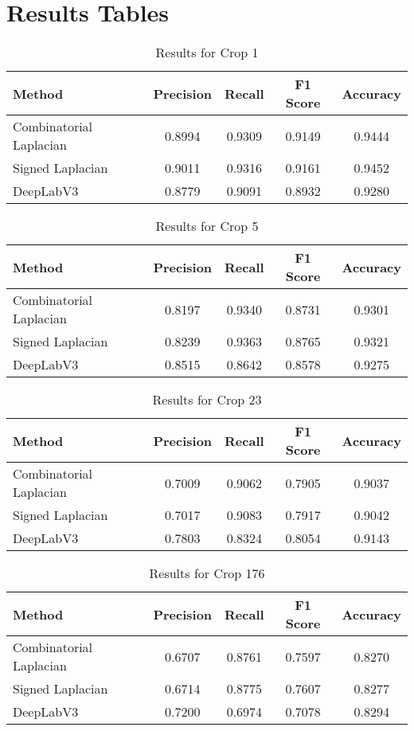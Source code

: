 \documentclass{article}
\begin{document}
\section*{Results Tables}

\begin{table}[h]
    \centering
    \caption{Results for Crop 1}
    \begin{tabular}{lcccc}
        \toprule
        Method & Precision & Recall & F1 Score & Accuracy \\
        \midrule
        Combinatorial Laplacian & 0.8994 & 0.9309 & 0.9149 & 0.9444 \\
        Signed Laplacian & 0.9011 & 0.9316 & 0.9161 & 0.9452 \\
        DeepLabV3 & 0.8779 & 0.9091 & 0.8932 & 0.9280 \\
        \bottomrule
    \end{tabular}
\end{table}

\begin{table}[h]
    \centering
    \caption{Results for Crop 5}
    \begin{tabular}{lcccc}
        \toprule
        Method & Precision & Recall & F1 Score & Accuracy \\
        \midrule
        Combinatorial Laplacian & 0.8197 & 0.9340 & 0.8731 & 0.9301 \\
        Signed Laplacian & 0.8239 & 0.9363 & 0.8765 & 0.9321 \\
        DeepLabV3 & 0.8515 & 0.8642 & 0.8578 & 0.9275 \\
        \bottomrule
    \end{tabular}
\end{table}

\begin{table}[h]
    \centering
    \caption{Results for Crop 23}
    \begin{tabular}{lcccc}
        \toprule
        Method & Precision & Recall & F1 Score & Accuracy \\
        \midrule
        Combinatorial Laplacian & 0.7009 & 0.9062 & 0.7905 & 0.9037 \\
        Signed Laplacian & 0.7017 & 0.9083 & 0.7917 & 0.9042 \\
        DeepLabV3 & 0.7803 & 0.8324 & 0.8054 & 0.9143 \\
        \bottomrule
    \end{tabular}
\end{table}

\begin{table}[h]
    \centering
    \caption{Results for Crop 176}
    \begin{tabular}{lcccc}
        \toprule
        Method & Precision & Recall & F1 Score & Accuracy \\
        \midrule
        Combinatorial Laplacian & 0.6707 & 0.8761 & 0.7597 & 0.8270 \\
        Signed Laplacian & 0.6714 & 0.8775 & 0.7607 & 0.8277 \\
        DeepLabV3 & 0.7200 & 0.6974 & 0.7078 & 0.8294 \\
        \bottomrule
    \end{tabular}
\end{table}
\end{document}
